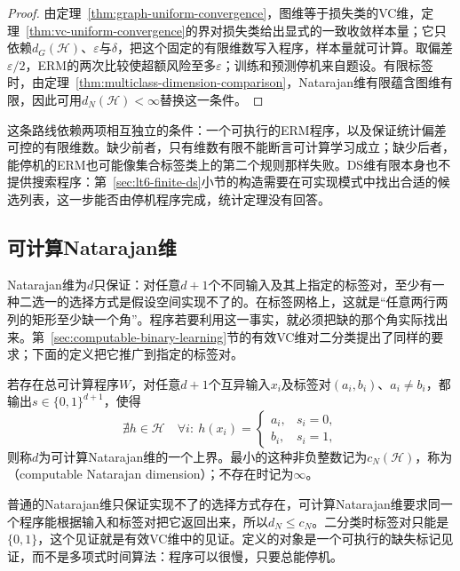 \begin{proof}
由定理~\ref{thm:graph-uniform-convergence}，图维等于损失类的VC维，定理~\ref{thm:vc-uniform-convergence}的界对损失类给出显式的一致收敛样本量；它只依赖$d_G(\mathcal H)$、$\varepsilon$与$\delta$，把这个固定的有限维数写入程序，样本量就可计算。取偏差$\varepsilon/2$，ERM的两次比较使超额风险至多$\varepsilon$；训练和预测停机来自题设。有限标签时，由定理~\ref{thm:multiclass-dimension-comparison}，Natarajan维有限蕴含图维有限，因此可用$d_N(\mathcal H)<\infty$替换这一条件。
\end{proof}

这条路线依赖两项相互独立的条件：一个可执行的ERM程序，以及保证统计偏差可控的有限维数。缺少前者，只有维数有限不能断言可计算学习成立；缺少后者，能停机的ERM也可能像集合标签类上的第二个规则那样失败。DS维有限本身也不提供搜索程序：第~\ref{sec:lt6-finite-ds}小节的构造需要在可实现模式中找出合适的候选列表，这一步能否由停机程序完成，统计定理没有回答。

\subsection{可计算Natarajan维}
\label{sec:lt6-computable-natarajan}

Natarajan维为$d$只保证：对任意$d+1$个不同输入及其上指定的标签对，至少有一种二选一的选择方式是假设空间实现不了的。在标签网格上，这就是“任意两行两列的矩形至少缺一个角”。程序若要利用这一事实，就必须把缺的那个角实际找出来。第~\ref{sec:computable-binary-learning}节的有效VC维对二分类提出了同样的要求；下面的定义把它推广到指定的标签对。

\begin{definition}[可计算Natarajan维]
\label{def:computable-natarajan-dimension}
若存在总可计算程序$W$，对任意$d+1$个互异输入$x_i$及标签对$(a_i,b_i)$、$a_i\neq b_i$，都输出$s\in\{0,1\}^{d+1}$，使得
\[
 \nexists h\in\mathcal H\quad
 \forall i:\ h(x_i)=\begin{cases}a_i,&s_i=0,\\b_i,&s_i=1,\end{cases}
\]
则称$d$为可计算Natarajan维的一个上界。最小的这种非负整数记为$c_N(\mathcal H)$，称为（computable Natarajan dimension）；不存在时记为$\infty$。
\end{definition}

普通的Natarajan维只保证实现不了的选择方式存在，可计算Natarajan维要求同一个程序能根据输入和标签对把它返回出来，所以$d_N\leq c_N$。二分类时标签对只能是$\{0,1\}$，这个见证就是有效VC维中的见证。定义的对象是一个可执行的缺失标记见证，而不是多项式时间算法：程序可以很慢，只要总能停机。

